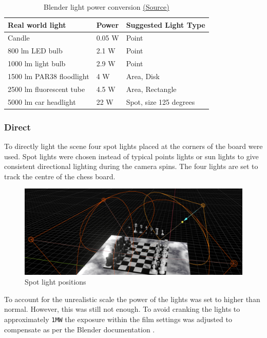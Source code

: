 \documentclass[11pt]{article}
\begin{document}
\begin{table}[htbp]
\caption{Blender light power conversion \href{https://docs.blender.org/manual/en/latest/render/lights/light\_object.html\#power-of-lights}{(Source)}}
\centering
\begin{tabular}{lll}
\hline
\textbf{Real world light} & \textbf{Power} & \textbf{Suggested Light Type}\\
\hline
Candle & 0.05 W & Point\\
\hline
800 lm LED bulb & 2.1 W & Point\\
\hline
1000 lm light bulb & 2.9 W & Point\\
\hline
1500 lm PAR38 floodlight & 4 W & Area, Disk\\
\hline
2500 lm fluorescent tube & 4.5 W & Area, Rectangle\\
\hline
5000 lm car headlight & 22 W & Spot, size 125 degrees\\
\hline
\end{tabular}
\end{table}

\subsubsection{Direct}
\label{sec:orgfaf5577}
To directly light the scene four spot lights placed at the corners of the board
were used. Spot lights were chosen instead of typical points lights or sun
lights to give consistent directional lighting during the camera spins. The four
lights are set to track the centre of the chess board.
\begin{figure}[htbp]
\centering
\includegraphics[width=\textwidth]{Images/lighting.png}
\caption{Spot light positions}
\end{figure}
To account for the unrealistic scale the power of the lights was set to higher
than normal. However, this was still not enough. To avoid cranking the lights
to approximately \texttt{1MW} the exposure within the film settings was adjusted to
compensate as per the Blender documentation \cite{light-power-docs}.
\end{document}
